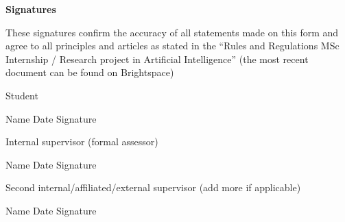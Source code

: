 \documentclass[
]{article}
\begin{document}
\textbf{Signatures}

These signatures confirm the accuracy of all statements made on this
form and agree to all principles and articles as stated in the ``Rules
and Regulations MSc Internship / Research project in Artificial
Intelligence'' (the most recent document can be found on Brightspace)

Student

Name Date Signature

Internal supervisor (formal assessor)

Name Date Signature

Second internal/affiliated/external supervisor (add more if applicable)

Name Date Signature
\end{document}
